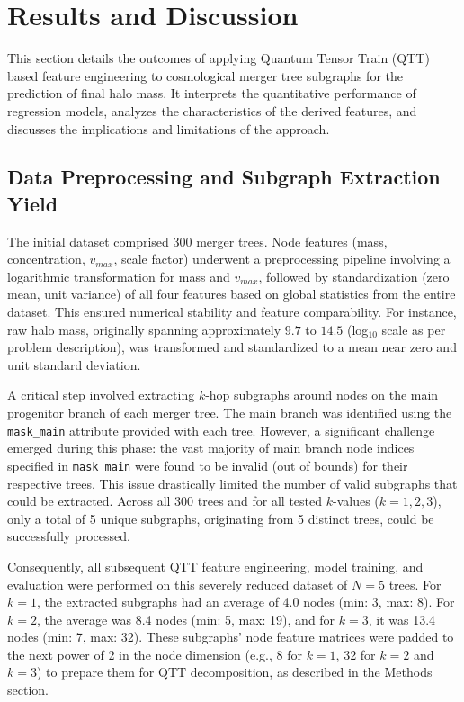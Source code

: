 \documentclass[twocolumn]{aastex631}
\begin{document}
\section{Results and Discussion}

This section details the outcomes of applying Quantum Tensor Train (QTT) based feature engineering to cosmological merger tree subgraphs for the prediction of final halo mass. It interprets the quantitative performance of regression models, analyzes the characteristics of the derived features, and discusses the implications and limitations of the approach.

\subsection{Data Preprocessing and Subgraph Extraction Yield}

The initial dataset comprised 300 merger trees. Node features (mass, concentration, $v_{max}$, scale factor) underwent a preprocessing pipeline involving a logarithmic transformation for mass and $v_{max}$, followed by standardization (zero mean, unit variance) of all four features based on global statistics from the entire dataset. This ensured numerical stability and feature comparability. For instance, raw halo mass, originally spanning approximately $9.7$ to $14.5$ (log$_{10}$ scale as per problem description), was transformed and standardized to a mean near zero and unit standard deviation.

A critical step involved extracting $k$-hop subgraphs around nodes on the main progenitor branch of each merger tree. The main branch was identified using the \texttt{mask\_main} attribute provided with each tree. However, a significant challenge emerged during this phase: the vast majority of main branch node indices specified in \texttt{mask\_main} were found to be invalid (out of bounds) for their respective trees. This issue drastically limited the number of valid subgraphs that could be extracted. Across all 300 trees and for all tested $k$-values ($k=1, 2, 3$), only a total of 5 unique subgraphs, originating from 5 distinct trees, could be successfully processed.

Consequently, all subsequent QTT feature engineering, model training, and evaluation were performed on this severely reduced dataset of $N=5$ trees. For $k=1$, the extracted subgraphs had an average of 4.0 nodes (min: 3, max: 8). For $k=2$, the average was 8.4 nodes (min: 5, max: 19), and for $k=3$, it was 13.4 nodes (min: 7, max: 32). These subgraphs' node feature matrices were padded to the next power of 2 in the node dimension (e.g., 8 for $k=1$, 32 for $k=2$ and $k=3$) to prepare them for QTT decomposition, as described in the Methods section.
\end{document}

